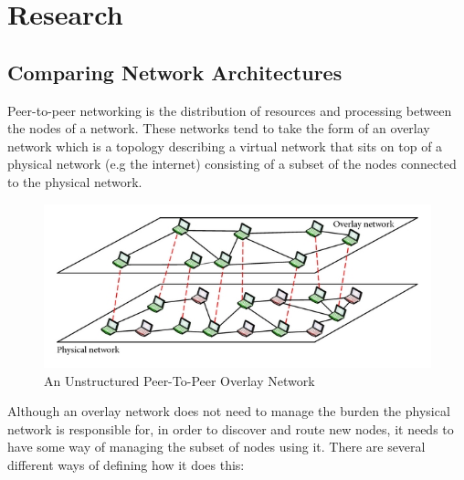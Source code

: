 \documentclass[]{report}
\begin{document}
	\section{Research}
		\subsection*{Comparing Network Architectures}	
			Peer-to-peer networking is the distribution of resources and processing between the nodes of a network. These networks tend to take the form of an overlay network which is a topology describing a virtual network that sits on top of a physical network (e.g the internet) consisting of a subset of the nodes connected to the physical network.
			
			\begin{figure}[h]
				\caption{
					An Unstructured Peer-To-Peer Overlay Network 	
					\cite{Unstructured P2P Diagram}
				}
				\centering
				\includegraphics{overlaynetwork.jpg}
			\end{figure}
			
			Although an overlay network does not need to manage the burden the physical network is responsible for, in order to discover and route new nodes, it needs to have some way of managing the subset of nodes using it. There are several different ways of defining how it does this:
			
\end{document}
